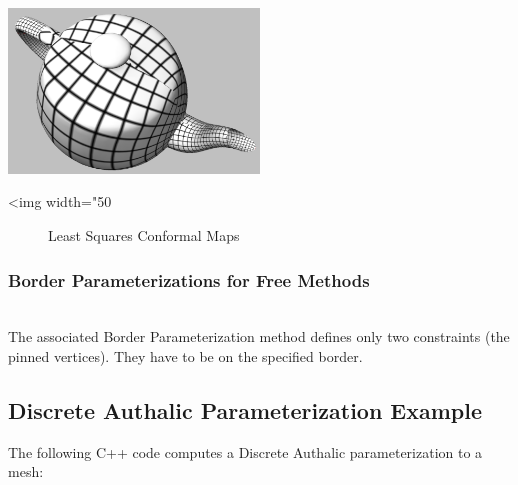 \begin{center}
    \label{Surface_mesh_parameterization-fig-LSCM}
    \begin{ccTexOnly}
        \includegraphics[width=0.5\textwidth]{Surface_mesh_parameterization/LSCM} %
    \end{ccTexOnly}
    \begin{ccHtmlOnly}
        <img width="50%
    \end{ccHtmlOnly}
    \begin{figure}[h]
        \caption{Least Squares Conformal Maps}
    \end{figure}
\end{center}


\subsubsection{Border Parameterizations for Free Methods}

  \\

The associated Border Parameterization method defines only two constraints
(the pinned vertices). They have to be on the specified border.


\subsection{Discrete Authalic Parameterization Example}

The following C++ code computes a Discrete Authalic parameterization
to a  mesh:

